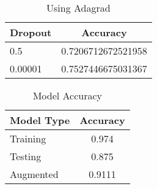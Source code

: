 \documentclass[12pt,english]{article}
\begin{document}
\begin{table}
\begin{center}
\begin{tabular}{l | c }
Dropout & Accuracy \\
\hline \hline
0.5 & 0.7206712672521958 \\ 
0.00001  & 0.7527446675031367\\
\end{tabular}
\caption{Using Adagrad}
\end{center}
\end{table}

\begin{table}
\begin{center}
\begin{tabular}{l | c }
Model Type & Accuracy \\
\hline \hline
Training & 0.974 \\ 
Testing & 0.875\\
Augmented & 0.9111
\end{tabular}
\caption{Model Accuracy}
\end{center}
\end{table}
\end{document}

